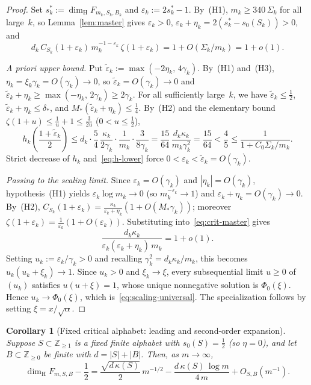 \documentclass[11pt]{article}
\newtheorem{corollary}[theorem]{Corollary}
\theoremstyle{definition}
\theoremstyle{remark}
\newcommand{\Z}{\mathbb{Z}}
\newcommand{\dimH}{\dim_{\mathrm{H}}}
\begin{document}
\begin{proof}
Set $s_k^*:=\dimH F_{m_k,S_k,B_k}$ and $\varepsilon_k:=2s_k^*-1$. By~(H1),
$m_k\ge 340\,\Sigma_k$ for all large~$k$, so Lemma~\ref{lem:master} gives
$\varepsilon_k>0$, $\varepsilon_k+\eta_k=2(s_k^*-s_0(S_k))>0$, and
\begin{equation}\label{eq:crit-master}
d_k\,C_{S_k}(1+\varepsilon_k)\,m_k^{-1-\varepsilon_k}\,\zeta(1+\varepsilon_k)
=1+O(\Sigma_k/m_k)=1+o(1).
\end{equation}

\emph{A priori upper bound.}
Put $\tilde\varepsilon_k:=\max(-2\eta_k,\,4\gamma_k)$. By~(H1) and~(H3),
$\eta_k=\xi_k\gamma_k=O(\gamma_k)\to0$, so $\tilde\varepsilon_k=O(\gamma_k)\to0$
and $\tilde\varepsilon_k+\eta_k\ge\max(-\eta_k,\,2\gamma_k)\ge 2\gamma_k$. For
all sufficiently large~$k$, we have $\tilde\varepsilon_k\le\frac12$,
$\tilde\varepsilon_k+\eta_k\le\delta_*$, and
$M_*(\tilde\varepsilon_k+\eta_k)\le\frac14$. By~(H2) and the elementary bound
$\zeta(1+u)\le\frac1u+1\le\frac{3}{2u}$ ($0<u\le\frac12$),
\[
h_k\!\left(\frac{1+\tilde\varepsilon_k}{2}\right)
\le d_k\cdot\frac54\,\frac{\kappa_k}{2\gamma_k}\cdot\frac{1}{m_k}\cdot\frac{3}{8\gamma_k}
=\frac{15}{64}\,\frac{d_k\kappa_k}{m_k\gamma_k^2}=\frac{15}{64}<\frac45
\le\frac{1}{1+C_0\Sigma_k/m_k}.
\]
Strict decrease of $h_k$ and~\eqref{eq:h-lower} force
$0<\varepsilon_k<\tilde\varepsilon_k=O(\gamma_k)$.

\emph{Passing to the scaling limit.}
Since $\varepsilon_k=O(\gamma_k)$ and $|\eta_k|=O(\gamma_k)$, hypothesis~(H1)
yields $\varepsilon_k\log m_k\to0$ (so $m_k^{-\varepsilon_k}\to1$) and
$\varepsilon_k+\eta_k=O(\gamma_k)\to0$. By~(H2),
$C_{S_k}(1+\varepsilon_k)=\frac{\kappa_k}{\varepsilon_k+\eta_k}(1+O(M_*\gamma_k))$;
moreover $\zeta(1+\varepsilon_k)=\frac{1}{\varepsilon_k}(1+O(\varepsilon_k))$.
Substituting into~\eqref{eq:crit-master} gives
\[
\frac{d_k\kappa_k}{\varepsilon_k(\varepsilon_k+\eta_k)\,m_k}=1+o(1).
\]
Setting $u_k:=\varepsilon_k/\gamma_k>0$ and recalling
$\gamma_k^2=d_k\kappa_k/m_k$, this becomes $u_k(u_k+\xi_k)\to1$. Since
$u_k>0$ and $\xi_k\to\xi$, every subsequential limit $u\ge0$ of $(u_k)$
satisfies $u(u+\xi)=1$, whose unique nonnegative solution is $\Phi_0(\xi)$.
Hence $u_k\to\Phi_0(\xi)$, which is~\eqref{eq:scaling-universal}. The
specialization follows by setting $\xi=x/\sqrt{\alpha}$.
\end{proof}

\begin{corollary}[Fixed critical alphabet: leading and second-order expansion]\label{cor:critical-exp}
Suppose $S\subset\Z_{\ge1}$ is a fixed finite alphabet with $s_0(S)=\frac12$
(so $\eta=0$), and let $B\subset\Z_{\ge0}$ be finite with $d=|S|+|B|$. Then,
as $m\to\infty$,
\begin{equation}\label{eq:critical-two-term}
\dimH F_{m,S,B}-\frac12
=\frac{\sqrt{d\,\kappa(S)}}{2}\,m^{-1/2}
-\frac{d\,\kappa(S)\,\log m}{4\,m}
+O_{S,B}(m^{-1}).
\end{equation}
\end{corollary}
\end{document}
